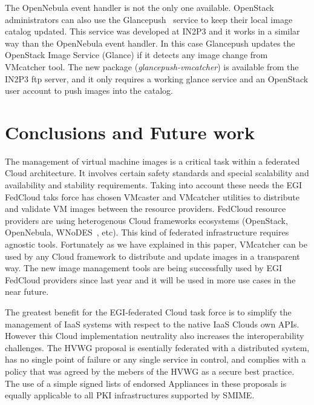 \documentclass{cai}
\begin{document}
The OpenNebula event handler is not the only one available. OpenStack administrators can also use the Glancepush~\cite{glancepush} service to keep their local image catalog updated. 
This service was developed at IN2P3 and it works in a similar way than the OpenNebula event handler. 
In this case Glancepush updates the OpenStack Image Service (Glance) if it detects any image change from VMcatcher tool. 
The new package (\textit{glancepush-vmcatcher}) is available from the IN2P3 ftp server, and it only requires a working glance service and an OpenStack user account to push images into the catalog.


\section{Conclusions and Future work}
\label{sect-conclusions}
The management of virtual machine images is a critical task within a federated Cloud architecture. It involves certain safety standards and special scalability and availability and stability requirements.
Taking into account these needs the EGI FedCloud taks force has chosen VMcaster and VMcatcher utilities to distribute and validate VM images between the resource providers.
FedCloud resource providers are using heterogenous Cloud frameworks ecosystems (OpenStack, OpenNebula, WNoDES~\cite{wnodes}, etc). This kind of federated infrastructure requires agnostic tools.
Fortunately as we have explained in this paper, VMcatcher can be used by any Cloud framework to distribute and update images in a transparent way. 
The new image management tools are being successfully used by EGI FedCloud providers since last year and it will be used in more use cases in the near future.

The greatest benefit for the EGI-federated Cloud task force is to simplify the management of IaaS systems with respect to the native IaaS Clouds own APIs. 
However this Cloud implementation neutrality also increases the interoperability challenges. 
The HVWG proposal is esentially federated with a distributed system, has no single point of failure or any single service in control, and complies with a policy that was agreed by the mebers of the HVWG as a secure best practice.
The use of a simple signed lists of endorsed Appliances in these proposals is equally applicable to all PKI infrastructures supported by SMIME. 
\end{document}
